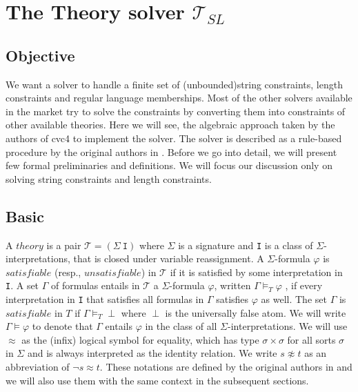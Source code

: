 \section{The Theory solver $ \mathcal{T}_{SL}$}
\label{sec:the theory solver}
\subsection{Objective }
\label{sec:objective}
We want a solver to handle a finite set of (unbounded)string constraints, length constraints and regular language memberships. Most of the other solvers available in the market try to solve the constraints by converting them into constraints of other available theories. Here we will see, the algebraic approach taken by the authors of cvc4 \cite{cvc4_website} to implement the solver. The solver is described as a rule-based procedure by the original authors in \cite{main-paper}. Before we go into detail, we will present few formal preliminaries and definitions. We will focus our discussion only on solving string constraints and length constraints.

\subsection{Basic}
\label{sec:basic}
A $theory$ is a pair $\mathcal{T} = (\Sigma\ \texttt{I})$ where $\Sigma$ is a signature and \texttt{I} is a class of $\Sigma$-interpretations, that is closed under variable reassignment. A $\Sigma$-formula $\varphi$ is $satisfiable$ (resp., $unsatisfiable$) in $\mathcal{T}$ if it is satisfied by some interpretation in \texttt{I}. A set $\Gamma$ of formulas entails in $\mathcal{T}$ a $\Sigma$-formula $\varphi$, written $\Gamma \models_{T} \varphi$ , if every interpretation in \texttt{I} that satisfies all formulas in $\Gamma$ satisfies $\varphi$ as well. The set $\Gamma$ is $satisfiable$ in $T$ if $\Gamma \models_{T} \perp$ where $\perp$ is the universally false atom. We will write $ \Gamma \models \varphi$ to denote that $ \Gamma$ entails $\varphi$ in the class of all $\Sigma$-interpretations. We will use $\approx$ as the (infix) logical symbol for equality, which has type $\sigma \times \sigma$ for all sorts $\sigma$ in $\Sigma$ and is always interpreted as the identity relation. We write $s \not\approx t$ as an abbreviation of $\neg s \approx t$. These notations are defined by the original authors in \cite{main-paper} and we will also use them with the same context in the subsequent sections.


